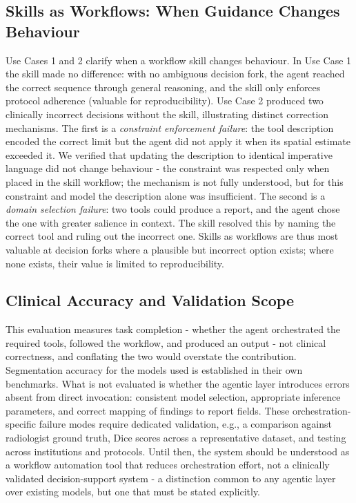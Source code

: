 \documentclass[conference]{IEEEtran}
\begin{document}
\subsection{Skills as Workflows: When Guidance Changes Behaviour}
Use Cases 1 and 2 clarify when a workflow skill changes behaviour. In Use Case 1 the skill made no difference: with no ambiguous decision fork, the agent reached the correct sequence through general reasoning, and the skill only enforces protocol adherence (valuable for reproducibility). Use Case 2 produced two clinically incorrect decisions without the skill, illustrating distinct correction mechanisms. The first is a \emph{constraint enforcement failure}: the tool description encoded the correct limit but the agent did not apply it when its spatial estimate exceeded it. We verified that updating the description to identical imperative language did not change behaviour - the constraint was respected only when placed in the skill workflow; the mechanism is not fully understood, but for this constraint and model the description alone was insufficient. The second is a \emph{domain selection failure}: two tools could produce a report, and the agent chose the one with greater salience in context. The skill resolved this by naming the correct tool and ruling out the incorrect one. Skills as workflows are thus most valuable at decision forks where a plausible but incorrect option exists; where none exists, their value is limited to reproducibility.

\subsection{Clinical Accuracy and Validation Scope}
This evaluation measures task completion - whether the agent orchestrated the required tools, followed the workflow, and produced an output - not clinical correctness, and conflating the two would overstate the contribution. Segmentation accuracy for the models used is established in their own benchmarks. What is not evaluated is whether the agentic layer introduces errors absent from direct invocation: consistent model selection, appropriate inference parameters, and correct mapping of findings to report fields. These orchestration-specific failure modes require dedicated validation, e.g., a comparison against radiologist ground truth, Dice scores across a representative dataset, and testing across institutions and protocols. Until then, the system should be understood as a workflow automation tool that reduces orchestration effort, not a clinically validated decision-support system - a distinction common to any agentic layer over existing models, but one that must be stated explicitly.
\end{document}
